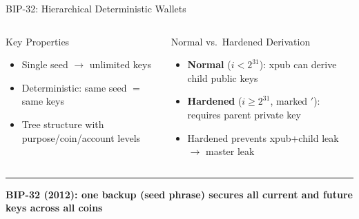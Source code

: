 \documentclass[8pt,aspectratio=169]{beamer}
\newcommand{\bottomnote}[1]{\vfill\vspace{-2mm}\textcolor{mllavender2}{\rule{\textwidth}{0.4pt}}\vspace{1mm}\footnotesize\textbf{#1}}
\begin{document}
\begin{frame}{BIP-32: Hierarchical Deterministic Wallets}
\begin{center}
\end{center}
\vspace{1mm}
\begin{columns}
\begin{block}{Key Properties}
\begin{itemize}\small
  \item Single seed $\to$ unlimited keys
  \item Deterministic: same seed $=$ same keys
  \item Tree structure with purpose/coin/account levels
\end{itemize}
\end{block}
\begin{block}{Normal vs.\ Hardened Derivation}
\begin{itemize}\small
  \item \textbf{Normal} ($i < 2^{31}$): xpub can derive child public keys
  \item \textbf{Hardened} ($i \geq 2^{31}$, marked $'$): requires parent private key
  \item Hardened prevents xpub+child leak $\to$ master leak
\end{itemize}
\end{block}
\end{columns}
\bottomnote{BIP-32 (2012): one backup (seed phrase) secures all current and future keys across all coins}
\end{frame}
\end{document}
